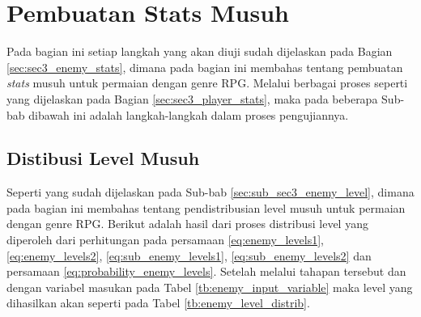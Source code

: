 \section{Pembuatan Stats Musuh}
\label{sec:sec4_eval_turn-based_enemy}
\vspace{1ex}

Pada bagian ini setiap langkah yang akan diuji sudah dijelaskan pada Bagian \ref{sec:sec3_enemy_stats}, dimana pada bagian ini membahas tentang pembuatan \textit{stats} musuh untuk permaian dengan genre RPG. Melalui berbagai proses seperti yang dijelaskan pada Bagian \ref{sec:sec3_player_stats}, maka pada beberapa Sub-bab dibawah ini adalah langkah-langkah dalam proses pengujiannya.
\vspace{1ex}


\subsection{Distibusi Level Musuh}
\label{sec:sub_sec4_eval_dist_enemy_level}
\vspace{1ex}

Seperti yang sudah dijelaskan pada Sub-bab \ref{sec:sub_sec3_enemy_level}, dimana pada bagian ini membahas tentang pendistribusian level musuh untuk permaian dengan genre RPG. Berikut adalah hasil dari proses distribusi level yang diperoleh dari perhitungan pada persamaan \ref{eq:enemy_levels1}, \ref{eq:enemy_levels2}, \ref{eq:sub_enemy_levels1}, \ref{eq:sub_enemy_levels2} dan persamaan \ref{eq:probability_enemy_levels}. Setelah melalui tahapan tersebut dan dengan variabel masukan pada Tabel \ref{tb:enemy_input_variable} maka level yang dihasilkan akan seperti pada Tabel \ref{tb:enemy_level_distrib}.
\vspace{-1ex}

